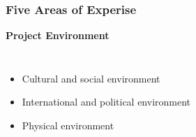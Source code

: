 \documentclass{beamer}
\begin{document}
\begin{frame}
\frametitle{Five Areas of Experise}
\textbf{Project Environment}\\
\vspace{0.5cm}
\begin{columns}[t]
\begin{itemize}
\item Cultural and social environment
\item International and political environment
\item Physical environment
\end{itemize}
\begin{figure}
\end{figure}
\end{columns}
\end{frame}
\end{document}
